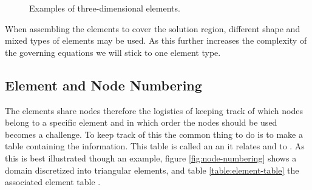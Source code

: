 \begin{figure}
  \centering
  \caption{Examples of three-dimensional elements.}
  \label{fig:3d-elements}
\end{figure}

When assembling the elements to cover the solution region, different
shape and mixed types of elements may be used. As this further
increases the complexity of the governing equations we will stick to
one element type.

\subsection{Element and Node Numbering}
The elements share nodes therefore the logistics of keeping track of which
nodes belong to a specific element and in which order the nodes should
be used becomes a challenge. To keep track of this the common thing to do
is to make a table containing the information. This table is called an
 an it relates  and
 to . As this is
best illustrated though an example, figure \vref{fig:node-numbering}
shows a domain discretized into triangular elements, and table
\vref{table:element-table} the associated element table
.

